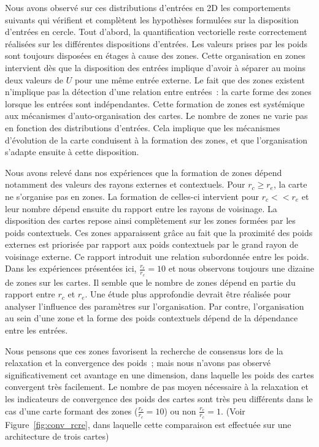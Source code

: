 \documentclass[../main]{subfiles}
\begin{document}
Nous avons observé sur ces distributions d'entrées en 2D les comportements suivants qui vérifient et complètent les hypothèses formulées sur la disposition d'entrées en cercle.
Tout d'abord, la quantification vectorielle reste correctement réalisées sur les différentes dispositions d'entrées. 
Les valeurs prises par les poids sont toujours disposées en étages à cause des zones.
Cette organisation en zones intervient dès que la disposition des entrées implique d'avoir à séparer au moins deux valeurs de $U$ pour une même entrée externe.
Le fait que des zones existent n'implique pas la détection d'une relation entre entrées~: la carte forme des zones lorsque les entrées sont indépendantes. Cette formation de zones est systémique aux mécanismes d'auto-organisation des cartes. Le nombre de zones ne varie pas en fonction des distributions d'entrées. Cela implique que les mécanismes d'évolution de la carte conduisent à la formation des zones, et que l'organisation s'adapte ensuite à cette disposition. 

Nous avons relevé dans nos expériences que la formation de zones dépend notamment des valeurs des rayons externes et contextuels. Pour $r_c \geq r_e$, la carte ne s'organise pas en zones. La formation de celles-ci intervient pour $r_c << r_e$ et leur nombre dépend ensuite du rapport entre les rayons de voisinage.
La disposition des cartes repose ainsi complètement sur les zones formées par les poids contextuels. 
Ces zones apparaissent grâce au fait que la proximité des poids externes est priorisée par rapport aux poids contextuels par le grand rayon de voisinage externe. Ce rapport introduit une relation subordonnée entre les poids. 
Dans les expériences présentées ici,  $\frac{r_e}{r_c} = 10$ et nous observons toujours une dizaine de zones sur les cartes. 
Il semble que le nombre de zones dépend en partie du rapport entre $r_c$ et $r_e$. Une étude plus approfondie devrait être réalisée pour analyser l'influence des paramètres sur l'organisation. Par contre, l'organisation au sein d'une zone et la forme des poids contextuels dépend de la dépendance entre les entrées. 

Nous pensons que ces zones favorisent la recherche de consensus lors de la relaxation et la convergence des poids~; mais nous n'avons pas observé significativement cet avantage en une dimension, dans laquelle les poids des cartes convergent très facilement. Le nombre de pas moyen nécessaire à la relaxation et les indicateurs de convergence des poids des cartes sont très peu différents dans le cas d'une carte formant des zones ($\frac{r_e}{r_c} = 10$) ou non  $\frac{r_e}{r_c} = 1$. (Voir Figure~\ref{fig:conv_rcre}, dans laquelle cette comparaison est effectuée sur une architecture de trois cartes) 
\end{document}
